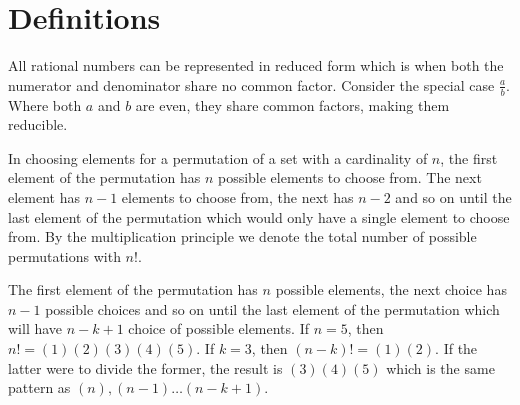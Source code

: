 \documentclass[12pt]{report}
\begin{document}

\section{Definitions}

\bigskip

All rational numbers can be represented in reduced form which is when both the numerator and denominator share no common factor. Consider the special case $\frac{a}{b}$. Where both $a$ and $b$ are even, they share common factors, making them reducible.\bigskip
{}\bigskip

In choosing elements for a permutation of a set with a cardinality of $n$, the first element of the permutation has $n$ possible elements to choose from. The next element has $n-1$ elements to choose from, the next has $n-2$ and so on until the last element of the permutation which would only have a single element to choose from. By the multiplication principle we denote the total number of possible permutations with $n!$.\medskip

\medskip

The first element of the permutation has $n$ possible elements, the next choice has $n-1$ possible choices and so on until the last element of the permutation which will have $n-k+1$ choice of possible elements. If $n=5$, then $n!=(1)(2)(3)(4)(5)$. If $k=3$, then $(n-k)!=(1)(2)$. If the latter were to divide the former, the result is $(3)(4)(5)$ which is the same pattern as $(n),(n-1) \dots (n-k+1)$.\bigskip
\end{document}
